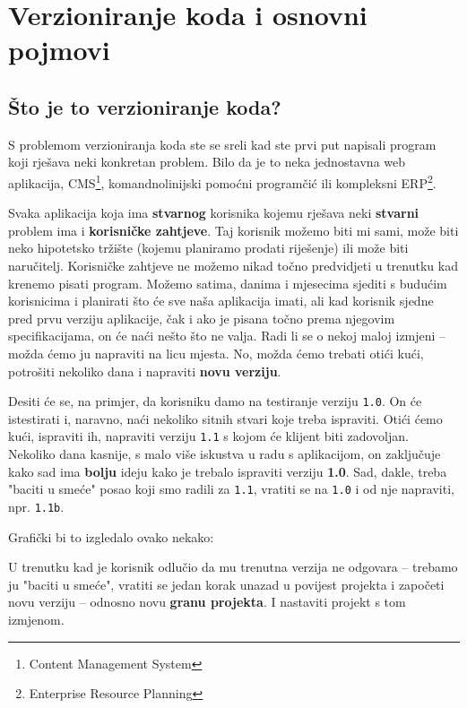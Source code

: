 \chapter*{Verzioniranje koda i osnovni pojmovi}

\section*{Što je to verzioniranje koda?}

S problemom verzioniranja koda ste se sreli kad ste prvi put napisali program koji rješava neki konkretan problem. 
Bilo da je to neka jednostavna web aplikacija, CMS\footnote{Content Management System}, komandnolinijski pomoćni programčić ili kompleksni ERP\footnote{Enterprise Resource Planning}.

Svaka aplikacija koja ima \textbf{stvarnog} korisnika kojemu rješava neki \textbf{stvarni} problem ima i \textbf{korisničke zahtjeve}.
Taj korisnik možemo biti mi sami, može biti neko hipotetsko tržište (kojemu planiramo prodati riješenje) ili može biti naručitelj.
Korisničke zahtjeve ne možemo nikad točno predvidjeti u trenutku kad krenemo pisati program.
Možemo satima, danima i mjesecima sjediti s budućim korisnicima i planirati što će sve naša aplikacija imati, ali kad korisnik sjedne pred prvu verziju aplikacije, čak i ako je pisana točno prema njegovim specifikacijama, on će naći nešto što ne valja. 
Radi li se o nekoj maloj izmjeni -- možda ćemo ju napraviti na licu mjesta.
No, možda ćemo trebati otići kući, potrošiti nekoliko dana i napraviti \textbf{novu verziju}.

Desiti će se, na primjer, da korisniku damo na testiranje verziju \texttt{1.0}.
On će istestirati i, naravno, naći nekoliko sitnih stvari koje treba ispraviti.
Otići ćemo kući, ispraviti ih, napraviti verziju \texttt{1.1} s kojom će klijent biti zadovoljan.
Nekoliko dana kasnije, s malo više iskustva u radu s aplikacijom, on zaključuje kako sad ima \textbf{bolju} ideju kako je trebalo ispraviti verziju \textbf{1.0}.
Sad, dakle, treba "baciti u smeće" posao koji smo radili za \texttt{1.1}, vratiti se na \texttt{1.0} i od nje napraviti, npr. \texttt{1.1b}.

Grafički bi to izgledalo ovako nekako:



U trenutku kad je korisnik odlučio da mu trenutna verzija ne odgovara -- trebamo ju "baciti u smeće", vratiti se jedan korak unazad u povijest projekta i započeti novu verziju -- odnosno novu \textbf{granu projekta}.
I nastaviti projekt s tom izmjenom.

